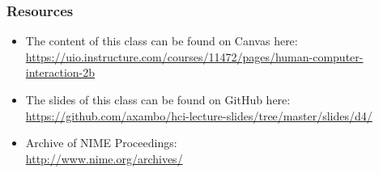 \documentclass[screen, aspectratio=43]{beamer}
\begin{document}
\begin{frame}
\frametitle{Resources}
\begin{itemize}
\item The content of this class can be found on Canvas here:\\
\url{https://uio.instructure.com/courses/11472/pages/human-computer-interaction-2b}
\item The slides of this class can be found on GitHub here: \\
\url{https://github.com/axambo/hci-lecture-slides/tree/master/slides/d4/}
\item Archive of NIME Proceedings:\\
\url{http://www.nime.org/archives/}
\end{itemize}
\end{frame}
%
%
\end{document}
